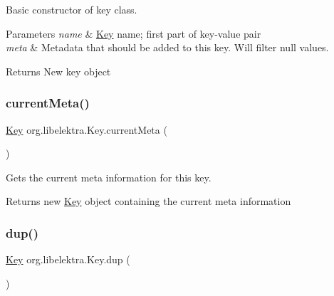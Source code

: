 Basic constructor of key class. 


\begin{DoxyParams}{Parameters}
{\em name} & \hyperlink{classorg_1_1libelektra_1_1Key}{Key} name; first part of key-\/value pair \\
\hline
{\em meta} & Metadata that should be added to this key. Will filter null values. \\
\hline
\end{DoxyParams}
\begin{DoxyReturn}{Returns}
New key object 
\end{DoxyReturn}
\mbox{\label{classorg_1_1libelektra_1_1Key_af6a740822cebbda1e500093c4d69c5f8}} 
\subsubsection{\texorpdfstring{current\+Meta()}{currentMeta()}}
{\footnotesize\ttfamily \hyperlink{classorg_1_1libelektra_1_1Key}{Key} org.\+libelektra.\+Key.\+current\+Meta (\begin{DoxyParamCaption}{ }\end{DoxyParamCaption})\hspace{0.3cm}{\ttfamily [inline]}}



Gets the current meta information for this key. 

\begin{DoxyReturn}{Returns}
new \hyperlink{classorg_1_1libelektra_1_1Key}{Key} object containing the current meta information 
\end{DoxyReturn}
\mbox{\label{classorg_1_1libelektra_1_1Key_a67a839951aa9bc48f8ffbb1ebcdfb819}} 
\subsubsection{\texorpdfstring{dup()}{dup()}}
{\footnotesize\ttfamily \hyperlink{classorg_1_1libelektra_1_1Key}{Key} org.\+libelektra.\+Key.\+dup (\begin{DoxyParamCaption}{ }\end{DoxyParamCaption})\hspace{0.3cm}{\ttfamily [inline]}}



